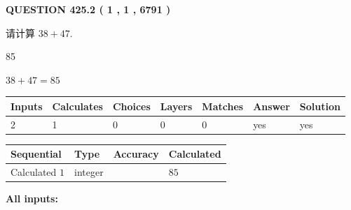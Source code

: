 \documentclass{ctexart}
\begin{document}
   
  
\vspace{0.2in}
  
{\textbf{\Large{QUESTION
425.2 
 ( 1 , 1 , 6791 )
}}}
  
  
 
请计算 $ %
38 +  %
47 $.
 
 
 
\noindent{}
 
 

85
 
 
\noindent{}
 
 

 
 
 
\noindent{}
 
 

$ %
38 +  %
47=   %
85$
 
 
\noindent{}
 
 

 
   
   
   
   
\noindent\begin{tabular}{|l|l|l|l|l|l|l|}
 \hline
Inputs & Calculates & Choices & Layers & Matches & Answer & Solution \\ \hline
 2  & 
 1  & 
 0
  & 
 0  & 
 0  & 
  yes & 
  yes 
  \\ \hline
 \end{tabular}
   
   
   
   
\noindent{}
   
   
  
  
\noindent\begin{tabular}{|l|l|l|l|}
\hline
 Sequential & Type & Accuracy & Calculated \\ 
\hline
 
 
  Calculated $  1 $ & integer &  & 
  $ 85 $ 
 \\  \hline  
 \end{tabular}
   
   
   
   
\noindent\vspace{0.1in}\hspace{-0.08in} {\textbf{\Large{All inputs: }}}
   
\end{document}
